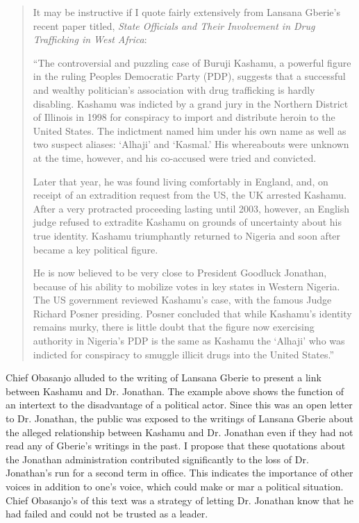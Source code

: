 \documentclass[output=paper,colorlinks,citecolor=brown]{langscibook}
\begin{document}
\begin{quote}
It may be instructive if I quote fairly extensively from Lansana Gberie’s recent paper titled, \textit{State Officials and Their Involvement in Drug Trafficking in West Africa}:

“The controversial and puzzling case of Buruji Kashamu, a powerful figure in the ruling Peoples Democratic Party (PDP), suggests that a successful and wealthy politician’s association with drug trafficking is hardly disabling. Kashamu was indicted by a grand jury in the Northern District of Illinois in 1998 for conspiracy to import and distribute heroin to the United States. The indictment named him under his own name as well as two suspect aliases: ‘Alhaji’ and ‘Kasmal.’ His whereabouts were unknown at the time, however, and his co-accused were tried and convicted.

Later that year, he was found living comfortably in England, and, on receipt of an extradition request from the US, the UK arrested Kashamu. After a very protracted proceeding lasting until 2003, however, an English judge refused to extradite Kashamu on grounds of uncertainty about his true identity. Kashamu triumphantly returned to Nigeria and soon after became a key political figure. 

He is now believed to be very close to President Goodluck Jonathan, because of his ability to mobilize votes in key states in Western Nigeria. The US government reviewed Kashamu’s case, with the famous Judge Richard Posner presiding. Posner concluded that while Kashamu’s identity remains murky, there is little doubt that the figure now exercising authority in Nigeria’s PDP is the same as Kashamu the ‘Alhaji’ who was indicted for conspiracy to smuggle illicit drugs into the United States.”
\end{quote}

Chief Obasanjo alluded to the writing of Lansana Gberie to present a link between Kashamu and Dr. Jonathan. The example above shows the function of an intertext to the disadvantage of a political actor. Since this was an open letter to Dr. Jonathan, the public was exposed to the writings of Lansana Gberie about the alleged relationship between Kashamu and Dr. Jonathan even if they had not read any of Gberie’s writings in the past. I propose that these quotations about the Jonathan administration contributed significantly to the loss of Dr. Jonathan’s run for a second term in office. This indicates the importance of other voices in addition to one’s voice, which could make or mar a political situation. Chief Obasanjo’s  of this text was a strategy of letting Dr. Jonathan know that he had failed and could not be trusted as a leader. 
\end{document}
